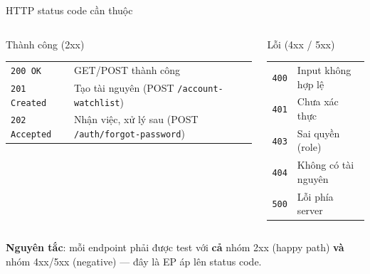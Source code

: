 \documentclass[aspectratio=169,12pt]{beamer}
\begin{document}
\begin{frame}{HTTP status code cần thuộc}
  \begin{columns}[T]
    \begin{block}{Thành công (2xx)}
      \footnotesize
      \begin{tabular}{>{\raggedright\arraybackslash}p{2.2cm}>{\raggedright\arraybackslash}p{3.2cm}}
        \texttt{200 OK} & GET/POST thành công \\
        \texttt{201 Created} & Tạo tài nguyên (POST \texttt{/account-\allowbreak watchlist}) \\
        \texttt{202 Accepted} & Nhận việc, xử lý sau (POST \texttt{/auth/\allowbreak forgot-\allowbreak password}) \\
      \end{tabular}
    \end{block}

    \begin{block}{Lỗi (4xx / 5xx)}
      \footnotesize
      \begin{tabular}{>{\raggedright\arraybackslash}p{2.2cm}>{\raggedright\arraybackslash}p{3.2cm}}
        \texttt{400} & Input không hợp lệ \\
        \texttt{401} & Chưa xác thực \\
        \texttt{403} & Sai quyền (role) \\
        \texttt{404} & Không có tài nguyên \\
        \texttt{500} & Lỗi phía server \\
      \end{tabular}
    \end{block}
  \end{columns}

  \vspace{0.2em}
  {\small \textbf{Nguyên tắc}: mỗi endpoint phải được test với \textbf{cả} nhóm
  2xx (happy path) \textbf{và} nhóm 4xx/5xx (negative) --- đây là EP áp lên
  status code.}
\end{frame}
\end{document}
